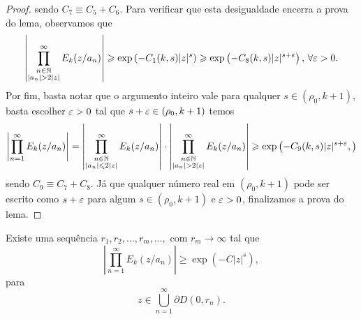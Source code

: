 \begin{proof}
        sendo $C_7 \equiv C_5 + C_6$. Para verificar que esta desigualdade encerra
        a prova do lema, observamos que
        \begin{equation*}
            \left|
            \prod_{\substack{n\in\mathbb{N} \\ |a_n| > 2|z|}}^{\infty} E_k(z/a_n)
            \right|
            \geqslant
            \exp
            \left(
            -C_1(k, s) |z|^s
            \right)
            \geqslant
            \exp
            \left(
            -C_8(k, s) |z|^{s + \varepsilon}
            \right), \, \forall \varepsilon > 0.
        \end{equation*}
        Por fim, basta notar que o argumento inteiro vale para qualquer 
        $s \in (\rho_0, k+1)$, basta escolher $\varepsilon > 0$ tal que
        $s + \varepsilon \in (\rho_0 , k+1)$ temos
        \begin{align*}
            \left|
            \prod_{n=1}^{\infty} E_k(z/a_n)
            \right|
            = 
            \left|
            \prod_{\substack{n\in\mathbb{N} \\ |a_n| \leqslant 2|z|}}^{\infty} E_k(z/a_n) 
            \right|
            \cdot
            \left|
            \prod_{\substack{n\in\mathbb{N} \\ |a_n| > 2|z|}}^{\infty} E_k(z/a_n)
            \right|
            \geqslant
            \exp
            \left(
            -C_9(k, s) |z|^{s + \varepsilon},
            \right)
        \end{align*}
        sendo $C_9 \equiv C_7 + C_8$. Já que qualquer número real em $(\rho_0, k+1)$
        pode ser escrito como $s + \varepsilon$ para algum $s \in (\rho_0, k+1)$ e $\varepsilon > 0$,
        finalizamos a prova do lema.
    \end{proof}
    \begin{corolario}
    \label{cor-seq-raios-inf}
        Existe uma sequência $r_1, r_2, \dots, r_m, \dots,$ com $r_m \to \infty$ tal que
        \begin{equation*}
            \left|
            \prod_{n=1}^{\infty} E_k(z/a_n)
            \right|
            \geq
            \exp(-C|z|^s),
        \end{equation*}
        para
        \begin{equation*}
            z \in \bigcup_{n=1}^{\infty} \partial D(0, r_n).
        \end{equation*}
    \end{corolario}
